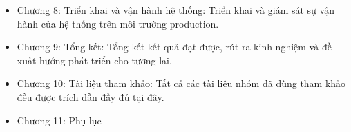\begin{itemize}
  \item Chương 8: Triển khai và vận hành hệ thống: Triển khai và giám sát sự vận hành của hệ thống trên môi trường production.
  
  \item Chương 9: Tổng kết: Tổng kết kết quả đạt được, rút ra kinh nghiệm và đề xuất hướng phát triển cho tương lai.
  
  \item Chương 10: Tài liệu tham khảo:  Tất cả các tài liệu nhóm đã dùng tham khảo đều được trích dẫn đầy đủ tại đây.
    
  \item Chương 11: Phụ lục
\end{itemize}
